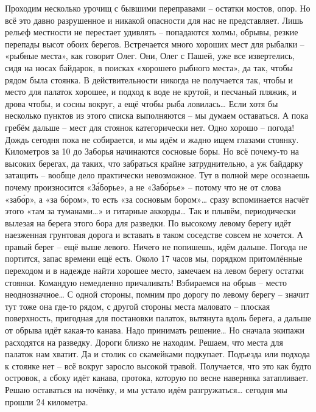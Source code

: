 Проходим несколько урочищ с бывшими переправами – остатки мостов, опор. Но всё это давно разрушенное и никакой опасности для нас не представляет. Лишь рельеф местности не перестает удивлять – попадаются холмы, обрывы, резкие перепады высот обоих берегов. Встречается много хороших мест для рыбалки – «рыбные места», как говорит Олег. Они, Олег с Пашей, уже все извертелись, сидя на носах байдарок, в поисках «хорошего рыбного места», да так, чтобы рядом была стоянка. В действительности никогда не получается так, чтобы и место для палаток хорошее, и подход к воде не крутой, и песчаный пляжик, и дрова чтобы, и сосны вокруг, а ещё чтобы рыба ловилась… Если хотя бы несколько пунктов из этого списка выполняются – мы думаем оставаться. А пока гребём дальше – мест для стоянок категорически нет.
Одно хорошо – погода! Дождь сегодня пока не собирается, и мы идём и жадно ищем глазами  стоянку. Километров за 10 до Заборья начинаются сосновые боры. Но всё почему-то на высоких берегах, да таких, что забраться крайне затруднительно, а уж байдарку затащить – вообще дело практически невозможное. Тут в полной мере осознаешь почему произносится «За́борье», а не «Забо́рье» – потому что не от слова «забо́р», а «за бо́ром», то есть «за сосновым бором»… сразу вспоминается насчёт этого «там за туманами…» и гитарные аккорды… Так и плывём, периодически вылезая на берега этого бора для разведки.
По высокому левому берегу идёт наезженная грунтовая дорога и вставать в таком соседстве совсем не хочется. А правый берег – ещё выше левого. Ничего не попишешь, идём дальше. Погода не портится, запас времени ещё есть. Около 17 часов мы, порядком притомлённые переходом и в надежде найти хорошее место, замечаем на левом берегу остатки стоянки. Командую немедленно причаливать! Взбираемся на обрыв – место неоднозначное… С одной стороны, помним про дорогу по левому берегу – значит тут тоже она где-то рядом, с другой стороны места маловато – плоская поверхность, пригодная для постановки палаток, вытянута вдоль берега, а дальше от обрыва идёт какая-то канава. Надо принимать решение… Но сначала экипажи расходятся на разведку. Дороги близко не находим. Решаем, что места для палаток нам хватит. Да и столик со скамейками подкупает. Подъезда или подхода к стоянке нет – всё вокруг заросло высокой травой. Получается, что это как будто островок, а сбоку идёт канава, протока, которую по весне наверняка затапливает. Решаю оставаться на ночёвку, и мы устало идём разгружаться… сегодня мы прошли 24 километра.
